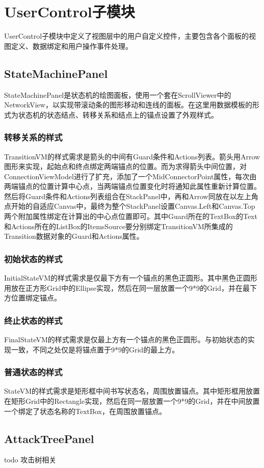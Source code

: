 \chapter{UserControl子模块}
UserControl子模块中定义了视图层中的用户自定义控件，主要包含各个面板的视图定义、数据绑定和用户操作事件处理。

\section{StateMachinePanel}
StateMachinePanel是状态机的绘图面板，使用一个套在ScrollViewer中的NetworkView，以实现带滚动条的图形移动和连线的面板。在这里用数据模板的形式为状态机的状态结点、转移关系和结点上的锚点设置了外观样式。
\subsection{转移关系的样式}
TransitionVM的样式需求是箭头的中间有Guard条件和Actions列表。箭头用Arrow图形来实现，起始点和终点绑定两端锚点的位置。而为求得箭头中间位置，对ConnectionViewModel进行了扩充，添加了一个MidConnectorPoint属性，每次由两端锚点的位置计算中心点，当两端锚点位置变化时将通知此属性重新计算位置。然后将Guard条件和Actions列表组合在StackPanel中，再和Arrow同放在以左上角点开始的自适应Canvas中，最终为整个StackPanel设置Canvas.Left和Canvas.Top两个附加属性绑定在计算出的中心点位置即可。其中Guard所在的TextBox的Text和Actions所在的ListBox的ItemsSource要分别绑定TransitionVM所集成的Transition数据对象的Guard和Actions属性。
\subsection{初始状态的样式}
InitialStateVM的样式需求是仅最下方有一个锚点的黑色正圆形。其中黑色正圆形用放在正方形Grid中的Ellipse实现，然后在同一层放置一个9*9的Grid，并在最下方位置绑定锚点。
\subsection{终止状态的样式}
FinalStateVM的样式需求是仅最上方有一个锚点的黑色正圆形。与初始状态的实现一致，不同之处仅是将锚点置于9*9的Grid的最上方。
\subsection{普通状态的样式}
StateVM的样式需求是矩形框中间书写状态名，周围放置锚点。其中矩形框用放置在矩形Grid中的Rectangle实现，然后在同一层放置一个9*9的Grid，并在中间放置一个绑定了状态名称的TextBox，在周围放置锚点。

\section{AttackTreePanel}
todo 攻击树相关